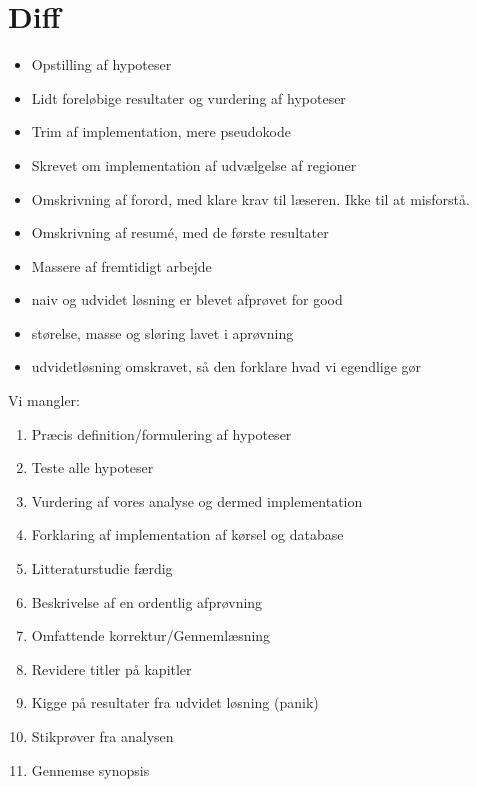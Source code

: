 {
\section*{Diff}
\begin{itemize}
    \item Opstilling af hypoteser
    \item Lidt foreløbige resultater og vurdering af hypoteser
    \item Trim af implementation, mere pseudokode
    \item Skrevet om implementation af udvælgelse af regioner
    \item Omskrivning af forord, med klare krav til læseren. Ikke
        til at misforstå.
    \item Omskrivning af resumé, med de første resultater
    \item Massere af fremtidigt arbejde
	\item naiv og udvidet løsning er blevet afprøvet for good
	\item størelse, masse og sløring lavet i aprøvning
	\item udvidetløsning omskravet, så den forklare hvad vi egendlige gør
\end{itemize}

Vi mangler:
\begin{enumerate}
    \item Præcis definition/formulering af hypoteser
    \item Teste alle hypoteser
    \item Vurdering af vores analyse og dermed implementation
    \item Forklaring af implementation af kørsel og database
    \item Litteraturstudie færdig
    \item Beskrivelse af en ordentlig afprøvning
    \item Omfattende korrektur/Gennemlæsning
    \item Revidere titler på kapitler
    \item Kigge på resultater fra udvidet løsning (panik)
    \item Stikprøver fra analysen
    \item Gennemse synopsis
\end{enumerate}
}

